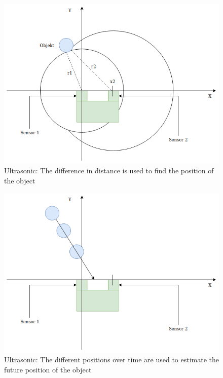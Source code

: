 \begin{figure}[h]
    \centering
    \includegraphics[scale=0.5]{Images/ultrasonic_trilateration.png}
    \caption{Ultrasonic: The difference in distance is used to find the position of the object}
    \label{fig:ultrasonic_trilateration}
\end{figure}

\begin{figure}
    \centering
    \includegraphics[scale=0.5]{Images/ultrasonic_motion.png}
    \caption{Ultrasonic: The different positions over time are used to estimate the future position of the object}
    \label{fig:ultrasonic_motion}
\end{figure}

